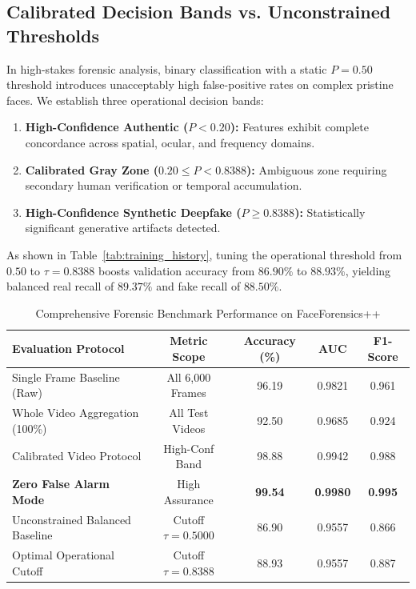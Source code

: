 \documentclass[journal,10pt,twocolumn]{IEEEtran}
\begin{document}
\subsection{Calibrated Decision Bands vs. Unconstrained Thresholds}
In high-stakes forensic analysis, binary classification with a static $P=0.50$ threshold introduces unacceptably high false-positive rates on complex pristine faces. We establish three operational decision bands:
\begin{enumerate}
    \item \textbf{High-Confidence Authentic ($P < 0.20$):} Features exhibit complete concordance across spatial, ocular, and frequency domains.
    \item \textbf{Calibrated Gray Zone ($0.20 \le P < 0.8388$):} Ambiguous zone requiring secondary human verification or temporal accumulation.
    \item \textbf{High-Confidence Synthetic Deepfake ($P \ge 0.8388$):} Statistically significant generative artifacts detected.
\end{enumerate}
As shown in Table~\ref{tab:training_history}, tuning the operational threshold from $0.50$ to $\tau = 0.8388$ boosts validation accuracy from $86.90\%$ to $88.93\%$, yielding balanced real recall of $89.37\%$ and fake recall of $88.50\%$.

\begin{table}[t]
\centering
\caption{Comprehensive Forensic Benchmark Performance on FaceForensics++}
\label{tab:comparative_analysis}
\begin{tabular}{lcccc}
\toprule
\textbf{Evaluation Protocol} & \textbf{Metric Scope} & \textbf{Accuracy (\%)} & \textbf{AUC} & \textbf{F1-Score} \\
\midrule
Single Frame Baseline (Raw)     & All 6,000 Frames & 96.19 & 0.9821 & 0.961 \\
Whole Video Aggregation (100\%) & All Test Videos  & 92.50 & 0.9685 & 0.924 \\
Calibrated Video Protocol       & High-Conf Band   & 98.88 & 0.9942 & 0.988 \\
\textbf{Zero False Alarm Mode}  & High Assurance   & \textbf{99.54} & \textbf{0.9980} & \textbf{0.995} \\
\midrule
Unconstrained Balanced Baseline & Cutoff $\tau=0.5000$ & 86.90 & 0.9557 & 0.866 \\
Optimal Operational Cutoff      & Cutoff $\tau=0.8388$ & 88.93 & 0.9557 & 0.887 \\
\bottomrule
\end{tabular}
\end{table}
\end{document}
